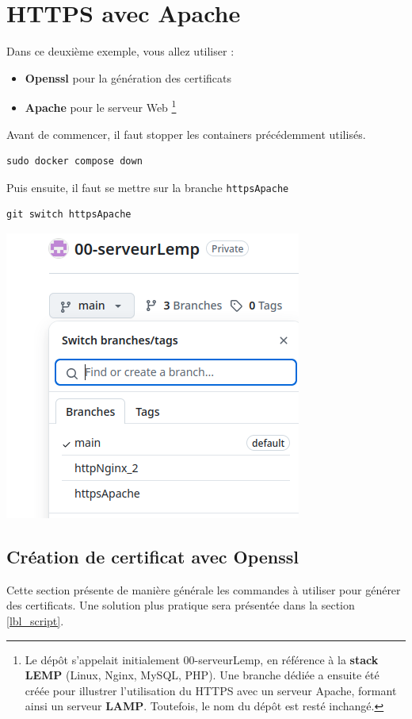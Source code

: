\documentclass[french, 12pt]{article}%
\newcommand{\itemE}{\item[$\bullet$]}
\begin{document}
\section{HTTPS avec Apache}
Dans ce deuxième exemple, vous allez utiliser  :
 \begin{itemize}
 \itemE \textbf{Openssl} pour la génération des certificats
 \itemE \textbf{Apache} pour le serveur Web \footnote{Le dépôt s’appelait initialement 00-serveurLemp, en référence à la \textbf{stack LEMP} (Linux, Nginx, MySQL, PHP). Une branche dédiée a ensuite été créée pour illustrer l’utilisation du HTTPS avec un serveur Apache, formant ainsi un serveur \textbf{LAMP}. Toutefois, le nom du dépôt est resté inchangé.}
 \end{itemize}

Avant de commencer, il faut stopper les containers précédemment utilisés. 
\begin{lstlisting}[style=commande]
sudo docker compose down
\end{lstlisting}

Puis ensuite, il faut se mettre sur la branche \verb?httpsApache ?
\begin{lstlisting}[style=commande]
git switch httpsApache 
\end{lstlisting}

\begin{center}
\includegraphics[scale=0.5]{./ressource/branchServeurLemp}
\end{center}

\subsection{Création de certificat avec Openssl}
Cette section présente de manière générale les commandes à utiliser pour générer des certificats. Une solution plus pratique sera présentée dans la section \ref{lbl_script}.
\end{document}
